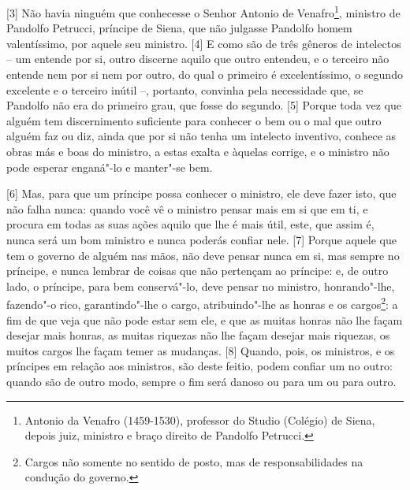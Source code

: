 {[}3{]} Não havia ninguém que conhecesse o Senhor Antonio de
Venafro\footnote{Antonio da Venafro (1459-1530), professor do Studio
  (Colégio) de Siena, depois juiz, ministro e braço direito de Pandolfo
  Petrucci.}, ministro de Pandolfo Petrucci, príncipe de Siena, que não
julgasse Pandolfo homem valentíssimo, por aquele seu ministro. {[}4{]} E
como são de três gêneros de intelectos -- um entende por si, outro
discerne aquilo que outro entendeu, e o terceiro não entende nem por si
nem por outro, do qual o primeiro é excelentíssimo, o segundo excelente
e o terceiro inútil --, portanto, convinha pela necessidade que, se
Pandolfo não era do primeiro grau, que fosse do segundo. {[}5{]} Porque
toda vez que alguém tem discernimento suficiente para conhecer o bem ou
o mal que outro alguém faz ou diz, ainda que por si não tenha um
intelecto inventivo, conhece as obras más e boas do ministro, a estas
exalta e àquelas corrige, e o ministro não pode esperar enganá"-lo e
manter"-se bem.

{[}6{]} Mas, para que um príncipe possa conhecer o ministro, ele deve
fazer isto, que não falha nunca: quando você vê o ministro pensar mais
em si que em ti, e procura em todas as suas ações aquilo que lhe é mais
útil, este, que assim é, nunca será um bom ministro e nunca poderás
confiar nele. {[}7{]} Porque aquele que tem o governo de alguém nas
mãos, não deve pensar nunca em si, mas sempre no príncipe, e nunca
lembrar de coisas que não pertençam ao príncipe: e, de outro lado, o
príncipe, para bem conservá"-lo, deve pensar no ministro, honrando"-lhe,
fazendo"-o rico, garantindo"-lhe o cargo, atribuindo"-lhe as honras e os
cargos\footnote{Cargos não somente no sentido de posto, mas de
  responsabilidades na condução do governo.}: a fim de que veja que não
pode estar sem ele, e que as muitas honras não lhe façam desejar mais
honras, as muitas riquezas não lhe façam desejar mais riquezas, os
muitos cargos lhe façam temer as mudanças. {[}8{]} Quando, pois, os
ministros, e os príncipes em relação aos ministros, são deste feitio,
podem confiar um no outro: quando são de outro modo, sempre o fim será
danoso ou para um ou para outro.


